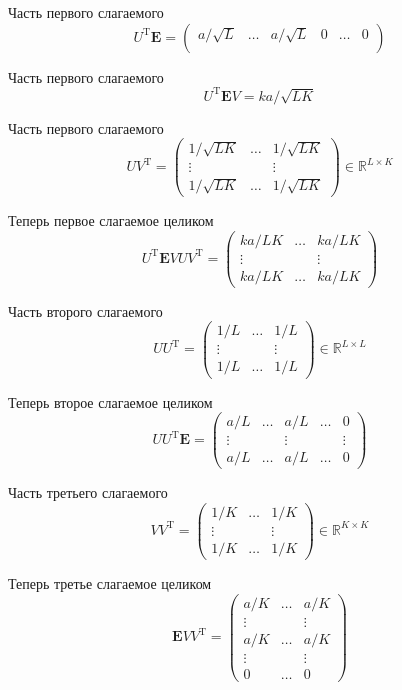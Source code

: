 \documentclass[specialist,
               substylefile = spbu.rtx,
               subf,href,colorlinks=true, 12pt]{disser}
\begin{document}
Часть первого слагаемого
$$U^{\mathrm{T}} \mathbf{E} = \begin{pmatrix}
	 a/\sqrt{L} & \ldots & a/\sqrt{L} & 0 & \ldots & 0\\
\end{pmatrix}$$

Часть первого слагаемого
$$U^{\mathrm{T}} \mathbf{E} V = k a / \sqrt{LK}$$

Часть первого слагаемого
$$U V^{\mathrm{T}} = \begin{pmatrix}
	1/\sqrt{LK} & \ldots & 1/\sqrt{LK}\\
	\vdots & & \vdots\\
	1/\sqrt{LK} &   \ldots &  1/\sqrt{LK}
\end{pmatrix}\in \mathbb{R}^{L \times K}
$$

Теперь первое слагаемое целиком
$$U^{\mathrm{T}} \mathbf{E} V U V^{\mathrm{T}} = \begin{pmatrix}
	k a/ LK & \ldots &  k a/ LK\\
	\vdots & & \vdots\\
	k a/ LK &   \ldots &  k a/ LK
\end{pmatrix}$$

Часть второго слагаемого
$$U U^{\mathrm{T}} = \begin{pmatrix}
	1/L & \ldots & 1/L\\
	
	\vdots & & \vdots\\
	1/L &   \ldots &  1/L
\end{pmatrix}\in \mathbb{R}^{L \times L}$$

Теперь второе слагаемое целиком
$$U U^{\mathrm{T}} \mathbf{E} = \begin{pmatrix}
	a/L & \ldots & a/L & \ldots & 0\\
	\vdots & & \vdots & & \vdots\\
	a/L & \ldots & a/L & \ldots & 0
\end{pmatrix}$$

Часть третьего слагаемого
$$V V^{\mathrm{T}} = \begin{pmatrix}
	1/K & \ldots & 1/K\\
	\vdots & & \vdots\\
	1/K &   \ldots &  1/K
\end{pmatrix}\in \mathbb{R}^{K \times K}$$

Теперь третье слагаемое целиком
$$\mathbf{E} V V^{\mathrm{T}} = \begin{pmatrix}
	a/K &  \ldots & a/K\\
	\vdots & & \vdots\\
	a/K &  \ldots & a/K\\
	\vdots & & \vdots\\
	0 & \ldots & 0
\end{pmatrix}$$
\end{document}
